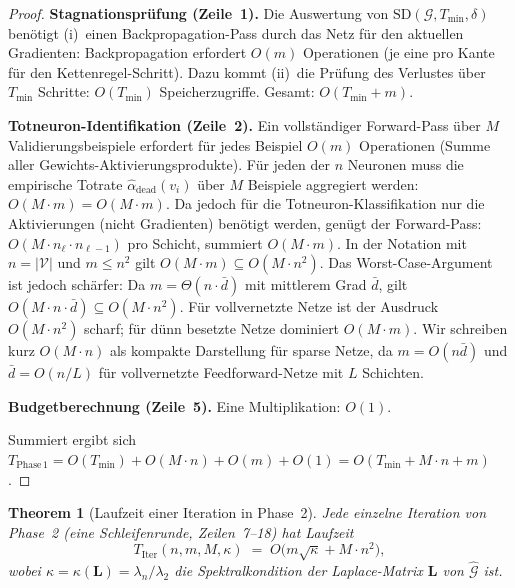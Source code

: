 \documentclass[12pt, a4paper, openany]{report}
\newtheorem{theorem}{Theorem}[chapter]
\newcommand{\calG}{\mathcal{G}}
\newcommand{\calV}{\mathcal{V}}
\begin{document}
\begin{proof}
\textbf{Stagnationsprüfung (Zeile~1).}
Die Auswertung von $\mathrm{SD}(\calG, T_{\min}, \delta)$ benötigt
(i)~einen Backpropagation-Pass durch das Netz für den aktuellen Gradienten:
Backpropagation erfordert $O(m)$ Operationen (je eine pro Kante für
den Kettenregel-Schritt).  Dazu kommt (ii)~die Prüfung des Verlustes über
$T_{\min}$ Schritte: $O(T_{\min})$ Speicherzugriffe.
Gesamt: $O(T_{\min} + m)$.

\textbf{Totneuron-Identifikation (Zeile~2).}
Ein vollständiger Forward-Pass über $M$ Validierungsbeispiele erfordert
für jedes Beispiel $O(m)$ Operationen (Summe aller Gewichts-Aktivierungsprodukte).
Für jeden der $n$ Neuronen muss die empirische Totrate
$\hat{\alpha}_{\mathrm{dead}}(v_i)$ über $M$ Beispiele aggregiert werden:
$O(M \cdot m) = O(M \cdot m)$.
Da jedoch für die Totneuron-Klassifikation nur die Aktivierungen
(nicht Gradienten) benötigt werden, genügt der Forward-Pass:
$O(M \cdot n_\ell \cdot n_{\ell-1})$ pro Schicht, summiert $O(M \cdot m)$.
In der Notation mit $n = |\calV|$ und $m \leq n^2$ gilt
$O(M \cdot m) \subseteq O(M \cdot n^2)$.
Das Worst-Case-Argument ist jedoch schärfer: Da $m = \Theta(n \cdot \bar{d})$
mit mittlerem Grad $\bar{d}$, gilt $O(M \cdot n \cdot \bar{d}) \subseteq O(M \cdot n^2)$.
Für vollvernetzte Netze ist der Ausdruck $O(M \cdot n^2)$
scharf; für dünn besetzte Netze dominiert $O(M \cdot m)$.  Wir schreiben
kurz $O(M \cdot n)$ als kompakte Darstellung für sparse Netze, da
$m = O(n \bar d)$ und $\bar d = O(n/L)$ für vollvernetzte Feedforward-Netze
mit $L$ Schichten.

\textbf{Budgetberechnung (Zeile~5).}
Eine Multiplikation: $O(1)$.

Summiert ergibt sich $T_{\mathrm{Phase\,1}} = O(T_{\min}) + O(M \cdot n) + O(m) + O(1)
= O(T_{\min} + M \cdot n + m)$.
\end{proof}

\begin{theorem}[Laufzeit einer Iteration in Phase~2]
\label{thm:runtime_phase2_iter}
Jede einzelne Iteration von Phase~2 (eine Schleifenrunde, Zeilen~7--18)
hat Laufzeit
\begin{equation}
  \label{eq:runtime_iteration}
  T_{\mathrm{Iter}}(n, m, M, \kappa)
  \;=\;
  O\!\bigl(m \sqrt{\kappa} + M \cdot n^2\bigr),
\end{equation}
wobei $\kappa = \kappa(\bm{L}) = \lambda_n / \lambda_2$ die
Spektralkondition der Laplace-Matrix $\bm{L}$ von $\hat{\calG}$ ist.
\end{theorem}
\end{document}
